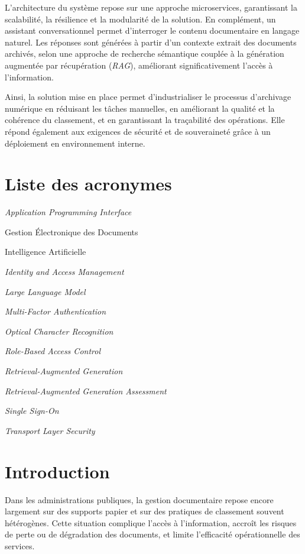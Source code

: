 \documentclass[12pt,a4paper]{report}
\begin{document}
L’architecture du système repose sur une approche microservices, garantissant la scalabilité, la résilience et la modularité de la solution. En complément, un assistant conversationnel permet d’interroger le contenu documentaire en langage naturel. Les réponses sont générées à partir d’un contexte extrait des documents archivés, selon une approche de recherche sémantique couplée à la génération augmentée par récupération (\textit{RAG}), améliorant significativement l’accès à l’information.

Ainsi, la solution mise en place permet d’industrialiser le processus d’archivage numérique en réduisant les tâches manuelles, en améliorant la qualité et la cohérence du classement, et en garantissant la traçabilité des opérations. Elle répond également aux exigences de sécurité et de souveraineté grâce à un déploiement en environnement interne.

\chapter*{Liste des acronymes}
\begin{description}[leftmargin=2.5cm, style=nextline]
  \item[API] \textit{Application Programming Interface}
  \item[GED] Gestion Électronique des Documents
  \item[IA] Intelligence Artificielle
  \item[IAM] \textit{Identity and Access Management}
  \item[LLM] \textit{Large Language Model}
  \item[MFA] \textit{Multi-Factor Authentication}
  \item[OCR] \textit{Optical Character Recognition}
  \item[RBAC] \textit{Role-Based Access Control}
  \item[RAG] \textit{Retrieval-Augmented Generation}
  \item[RAGAS] \textit{Retrieval-Augmented Generation Assessment}
  \item[SSO] \textit{Single Sign-On}
  \item[TLS] \textit{Transport Layer Security}
\end{description}

\pagestyle{main}

\chapter*{Introduction}
Dans les administrations publiques, la gestion documentaire repose encore largement sur des supports papier et sur des pratiques de classement souvent hétérogènes. Cette situation complique l’accès à l’information, accroît les risques de perte ou de dégradation des documents, et limite l’efficacité opérationnelle des services.
\end{document}
